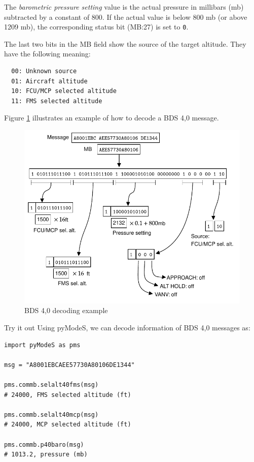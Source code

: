 The \emph{barometric pressure setting} value is the actual pressure in millibars (mb) subtracted by a constant of 800. If the actual value is below 800 mb (or above 1209 mb), the corresponding status bit (MB:27) is set to \texttt{0}.

The last two bits in the MB field show the source of the target altitude. They have the following meaning:

\begin{verbatim}
  00: Unknown source
  01: Aircraft altitude
  10: FCU/MCP selected altitude
  11: FMS selected altitude
\end{verbatim}


Figure \ref{fig:bds40_example} illustrates an example of how to decode a BDS 4,0 message.

\begin{figure}[ht]
  \centering
  \includegraphics[scale=0.9]{figures/mode_s/bds40_example.pdf}
  \caption{BDS 4,0 decoding example}
  \label{fig:bds40_example}
\end{figure}

\begin{notebox}{Try it out}
Using pyModeS, we can decode information of BDS 4,0 messages as: 

\begin{verbatim}
import pyModeS as pms

msg = "A8001EBCAEE57730A80106DE1344"

pms.commb.selalt40fms(msg)
# 24000, FMS selected altitude (ft)

pms.commb.selalt40mcp(msg)
# 24000, MCP selected altitude (ft)

pms.commb.p40baro(msg)
# 1013.2, pressure (mb)
\end{verbatim}

\end{notebox}


